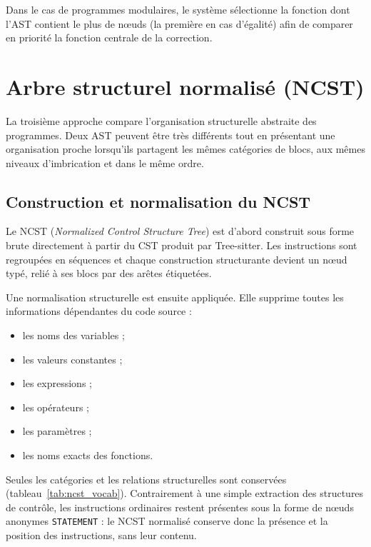 {Dans le cas de programmes modulaires, le système sélectionne la fonction dont
l'AST contient le plus de nœuds (la première en cas d'égalité) afin de
comparer en priorité la fonction centrale de la correction.

\section{Arbre structurel normalisé (NCST)}

La troisième approche compare l'organisation structurelle abstraite des
programmes. Deux AST peuvent être très différents tout en présentant une
organisation proche lorsqu'ils partagent les mêmes catégories de blocs, aux
mêmes niveaux d'imbrication et dans le même ordre.

\subsection{Construction et normalisation du NCST}

Le NCST (\emph{Normalized Control Structure Tree}) est d'abord construit sous
forme brute directement à partir du CST produit par Tree-sitter. Les
instructions sont regroupées en séquences et chaque construction structurante
devient un nœud typé, relié à ses blocs par des arêtes étiquetées.

Une normalisation structurelle est ensuite appliquée. Elle supprime toutes les
informations dépendantes du code source :
\begin{itemize}
  \item les noms des variables ;
  \item les valeurs constantes ;
  \item les expressions ;
  \item les opérateurs ;
  \item les paramètres ;
  \item les noms exacts des fonctions.
\end{itemize}

Seules les catégories et les relations structurelles sont conservées
(tableau~\ref{tab:ncst_vocab}). Contrairement à une simple extraction des
structures de contrôle, les instructions ordinaires restent présentes sous la
forme de nœuds anonymes \texttt{STATEMENT} : le NCST normalisé conserve donc
la présence et la position des instructions, sans leur contenu.

}
